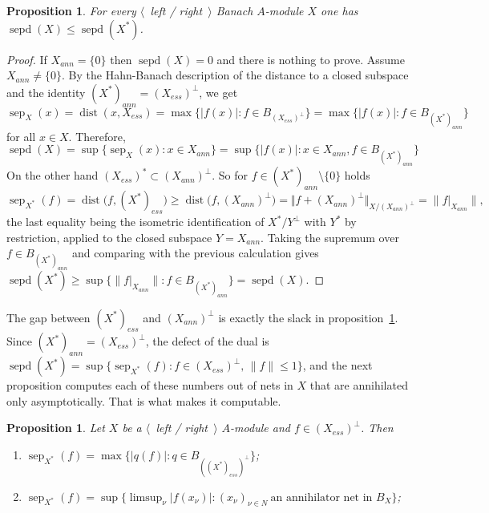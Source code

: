 \documentclass[11pt]{article}
\theoremstyle{plain}
\newtheorem{proposition}[theorem]{Proposition}
\theoremstyle{definition}
\DeclareMathOperator{\dist}{dist}
\DeclareMathOperator{\sep}{sep}
\DeclareMathOperator{\sepd}{sepd}
\begin{document}
\begin{proposition}\label{SepVsSepDual}
For every $\langle$~left / right~$\rangle$ Banach $A$-module $X$ one has 
$\sepd(X)\leq\sepd(X^*)$.
\end{proposition}

\begin{proof}
If $X_{ann}= \{0 \}$ then $\sepd(X)=0$ and there is nothing to prove. Assume
$X_{ann}\neq \{0 \}$. By the Hahn-Banach description of the distance to a closed
subspace and the identity ${(X^*)}_{ann}={(X_{ess})}^\perp$, we get
\[
\sep_X(x)
=\dist(x, X_{ess})
=\max \{|f(x)|:f\in B_{(X_{ess})^{\perp}} \}
=\max \{|f(x)|:f\in B_{{(X^*)}_{ann}} \}
\]
for all $x\in X$. Therefore,
\[
\sepd(X)
=\sup \{ \sep_X(x) : x\in X_{ann} \}
=\sup \{ |f(x)| : x\in X_{ann}, f\in B_{{(X^*)}_{ann}} \}
\]
On the other hand $(X_{ess})^*\subset(X_{ann})^\perp$. So 
for $f\in{(X^*)}_{ann}\setminus \{0 \}$ holds
\[
\sep_{X^*}(f)=\dist \bigl(f,{(X^*)}_{ess} \bigr)
\geq\dist \bigl(f,{(X_{ann})}^\perp \bigr)
=\Vert f+{(X_{ann})}^{\perp}\Vert_{X/(X_{ann})^\perp}
=\bigl\lVert f|_{X_{ann}}\bigr\rVert ,
\]
the last equality being the isometric identification of $X^*/Y^\perp$ with $Y^*$
by restriction, applied to the closed subspace $Y=X_{ann}$. Taking the supremum 
over $f\in B_{{(X^*)}_{ann}}$ and comparing with the previous
calculation gives 
$
\sepd(X^*)
\geq\sup \bigl \{ \lVert f|_{X_{ann}}\rVert : f\in B_{{(X^*)}_{ann}} \bigr \}
=\sepd(X).
$
\end{proof}

The gap between ${(X^*)}_{ess}$ and ${(X_{ann})}^\perp$ is exactly the slack in
proposition~\ref{SepVsSepDual}. Since ${(X^*)}_{ann}={(X_{ess})}^\perp$, the
defect of the dual is
$\sepd(X^*)=\sup \{\sep_{X^*}(f):f\in{(X_{ess})}^\perp,\,\lVert f\rVert\leq 1 \}$,
and the next proposition computes each of these numbers out of nets in $X$ that
are annihilated only asymptotically. That is what makes it computable.

\begin{proposition}\label{SepOfDualViaAnnihNets}
Let $X$ be a $\langle$~left / right~$\rangle$ $A$-module 
and $f\in{(X_{ess})}^\perp$. Then
\begin{enumerate}[label = (\roman*)]
\item $\sep_{X^*}(f)=\max \{|q(f)| : q\in B_{{({(X^*)}_{ess})}^{\perp}} \}$;

\item $\sep_{X^*}(f)=\sup \bigl \{
  \textstyle\limsup_\nu|f(x_\nu)|:
  {(x_\nu)}_{\nu\in N}\ \text{an annihilator net in }B_X
 \bigr \} $;

\end{enumerate}
\end{proposition}
\end{document}
